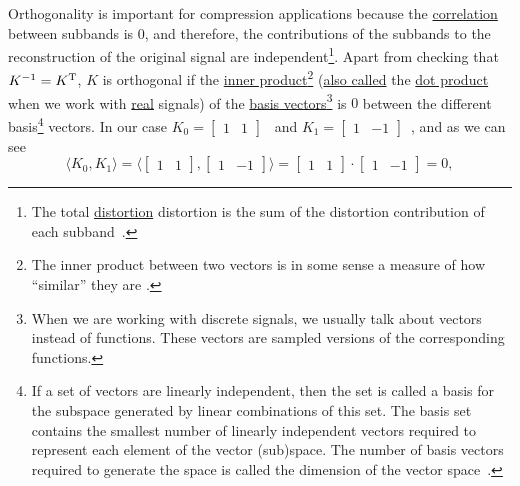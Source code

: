 Orthogonality is important for compression applications because the
\href{https://en.wikipedia.org/wiki/Correlation_and_dependence}{correlation}
between subbands is 0, and therefore, the contributions of the
subbands to the reconstruction of the original signal are
independent\footnote{The total
  \href{https://en.wikipedia.org/wiki/Distortion}{distortion}
  distortion is the sum of the distortion
  contribution of each subband~\cite{sayood2017introduction}.}. Apart
from checking that $K^{-1}=K^{\text T}$, $K$ is orthogonal if the
\href{https://en.wikipedia.org/wiki/Inner_product_space}{inner
  product}\footnote{The inner product between two vectors is in some
  sense a measure of how ``similar'' they are
  \cite{sayood2017introduction}.}
(\href{https://math.stackexchange.com/questions/476738/difference-between-dot-product-and-inner-product}{also
  called} the \href{https://en.wikipedia.org/wiki/Dot_product}{dot
  product} when we work with
\href{https://en.wikipedia.org/wiki/Real_number}{real} signals) of the
\href{https://en.wikipedia.org/wiki/Basis_(linear_algebra)}{basis
  vectors}\footnote{When we are working with discrete signals, we
  usually talk about vectors instead of functions. These vectors are
  sampled versions of the corresponding functions.} is $0$ between
the different basis\footnote{If a set of vectors are linearly
  independent, then the set is called a basis for the subspace
  generated by linear combinations of this set. The basis set contains
  the smallest number of linearly independent vectors required to
  represent each element of the vector (sub)space. The number of basis
  vectors required to generate the space is called the dimension of
  the vector space~\cite{sayood2017introduction}.} vectors. In our
case $K_0=\begin{bmatrix}1 & 1\end{bmatrix}$~ and
$K_1=\begin{bmatrix} 1 & -1\end{bmatrix}$~, and as we can see
\begin{equation}
  \langle K_0,K_1 \rangle =
  \langle \begin{bmatrix}
    1 & 1
  \end{bmatrix}
  ,
  \begin{bmatrix}
    1 & -1
  \end{bmatrix}
  \rangle =
  \begin{bmatrix}
    1 & 1
  \end{bmatrix}
  \cdot
  \begin{bmatrix}
    1 & -1
  \end{bmatrix}
   = 0,
\end{equation}
